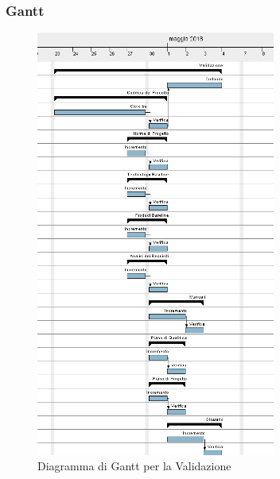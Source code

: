 \subsubsection{Gantt}
\begin{figure}[H]
	\centering 
	\includegraphics[width=0.7\textwidth]{images/Validazione.png}
	\caption{Diagramma di Gantt per la Validazione}
	\label{graficobello6} 
\end{figure}
